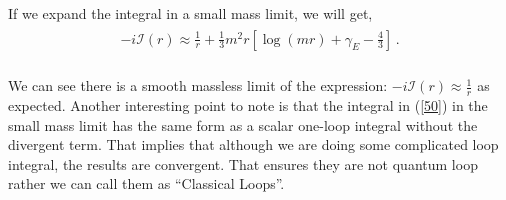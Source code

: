 If we expand the integral in a small mass limit, we will get,
\begin{align}
    \begin{split}
        -i\mathcal{I}(r)\approx\frac{1}{r}+\frac{1}{3} m^2 r [\log \left(mr\right)+ \gamma_E -\frac{4}{3}]\,.\label{50}
    \end{split}
\end{align}\\
We can see there is a smooth massless limit of the expression: $-i\mathcal{I}(r)\approx\frac{1}{r}$ as expected. Another interesting point to note is that the integral in (\ref{50}) in the small mass limit has the same form as a scalar one-loop integral without the divergent term. That implies that although we are doing some complicated loop integral, the results are convergent. That ensures they are not quantum loop rather we can call them as ``Classical Loops''.\par
